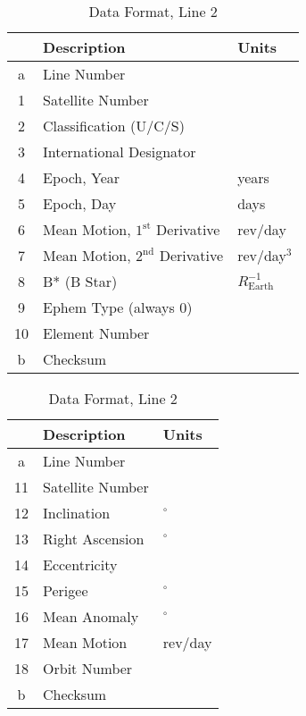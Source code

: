\begin{table}[!htb]\small

\begin{minipage}{.49\textwidth}
\centering

\caption{Data Format, Line 1}
\label{tab:tle-line-1}

\medskip

\begin{tabular}{|c|ll|}
\hline

\multicolumn{1}{|l|}{} & \multicolumn{1}{l|}{Description} & \multicolumn{1}{l|}{Units} \\ \hline
a  & Line Number   &   \\ \hline
1  & Satellite Number   &   \\
2  & Classification (U/C/S)   &   \\
3  & International Designator   &   \\
4  & Epoch, Year   & years  \\ 
5  & Epoch, Day   & days  \\
6  & Mean Motion, $1^{\mathrm{st}}$ Derivative & rev/day  \\
7  & Mean Motion, $2^{\mathrm{nd}}$ Derivative    & rev/day$^3$  \\
8  & B* (B Star)   & $R_{\mathrm{Earth}}^{-1}$  \\
9  &  Ephem Type (always 0)  &   \\
10  &  Element Number  &   \\ \hline
b  & Checksum   &  \\
\hline

\end{tabular}
\end{minipage}\hfill
\begin{minipage}{.49\textwidth}
\centering

\caption{Data Format, Line 2}
\label{tab:tle-line-2}

\medskip

\begin{tabular}{|c|ll|}
\hline

\multicolumn{1}{|l|}{} & \multicolumn{1}{l|}{Description} & \multicolumn{1}{l|}{Units} \\ \hline
a  & Line Number   &   \\ \hline
11 & Satellite Number   &   \\
12 & Inclination   & $^\circ$  \\
13 & Right Ascension   & $^\circ$  \\
14 & Eccentricity &   \\
15 & Perigee & $^\circ$  \\
16 & Mean Anomaly & $^\circ$ \\
17 & Mean Motion & rev/day \\
18 & Orbit Number &  \\ \hline
b  & Checksum   &  \\
\hline

\end{tabular}
\end{minipage}


\end{table}

